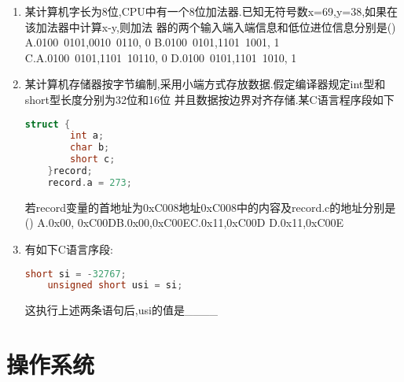 \documentclass[12pt, a4paper, oneside, UTF8]{ctexbook}
\begin{document}
\begin{enumerate}
    \item 某计算机字长为8位,CPU中有一个8位加法器.已知无符号数x=69,y=38,如果在该加法器中计算x-y,则加法
    器的两个输入端入端信息和低位进位信息分别是() \\
    A.0100\ 0101,0010\ 0110, 0 \qquad B.0100\ 0101,1101\ 1001, 1 \\
    C.A.0100\ 0101,1101\ 10110, 0 \qquad D.0100\ 0101,1101\ 1010, 1
    \item 某计算机存储器按字节编制,采用小端方式存放数据.假定编译器规定int型和short型长度分别为32位和16位
    并且数据按边界对齐存储.某C语言程序段如下
\begin{lstlisting}[language=C]
    struct {
        int a;
        char b;
        short c;
    }record;
    record.a = 273;
\end{lstlisting}
    若record变量的首地址为0xC008地址0xC008中的内容及record.c的地址分别是()
    A.0x00, 0xC00D\qquad B.0x00,0xC00E\qquad C.0x11,0xC00D \qquad D.0x11,0xC00E 

    \item 有如下C语言序段:
\begin{lstlisting}[language=C]
    short si = -32767;
    unsigned short usi = si;
\end{lstlisting}
    这执行上述两条语句后,usi的值是\_\_\_\_ 
\end{enumerate}
\section{操作系统}
\end{document}
